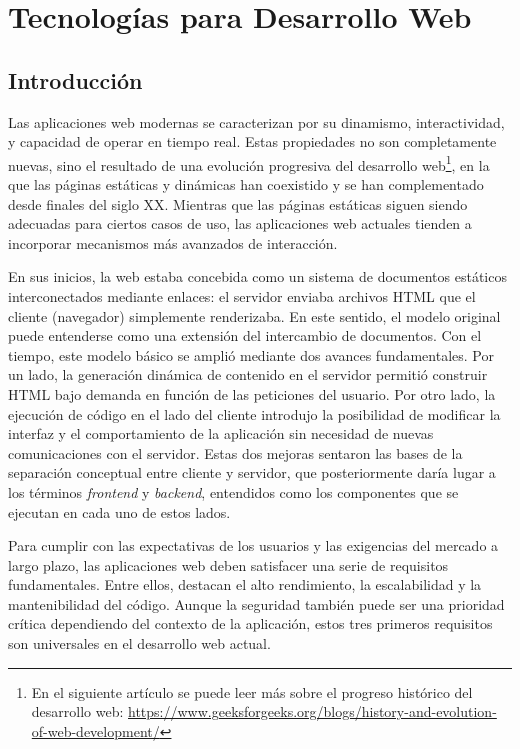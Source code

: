\chapter{Tecnologías para Desarrollo Web}
\label{cap:estadoDelArteDeTecnologias}


\section{Introducción}

Las aplicaciones web modernas se caracterizan por su dinamismo, interactividad, y capacidad de operar en tiempo real. Estas propiedades no son completamente nuevas, sino el resultado de una evolución progresiva del desarrollo web\footnote{En el siguiente artículo se puede leer más sobre el progreso histórico del desarrollo web: \url{https://www.geeksforgeeks.org/blogs/history-and-evolution-of-web-development/}}, en la que las páginas estáticas y dinámicas han coexistido y se han complementado desde finales del siglo XX. Mientras que las páginas estáticas siguen siendo adecuadas para ciertos casos de uso, las aplicaciones web actuales tienden a incorporar mecanismos más avanzados de interacción. 

En sus inicios, la web estaba concebida como un sistema de documentos estáticos interconectados mediante enlaces: el servidor enviaba archivos HTML que el cliente (navegador) simplemente renderizaba. En este sentido, el modelo original puede entenderse como una extensión del intercambio de documentos. Con el tiempo, este modelo básico se amplió mediante dos avances fundamentales. Por un lado, la generación dinámica de contenido en el servidor permitió construir HTML bajo demanda en función de las peticiones del usuario. Por otro lado, la ejecución de código en el lado del cliente introdujo la posibilidad de modificar la interfaz y el comportamiento de la aplicación sin necesidad de nuevas comunicaciones con el servidor. Estas dos mejoras sentaron las bases de la separación conceptual entre cliente y servidor, que posteriormente daría lugar a los términos \textit{frontend} y \textit{backend}, entendidos como los componentes que se ejecutan en cada uno de estos lados.

Para cumplir con las expectativas de los usuarios y las exigencias del mercado a largo plazo, las aplicaciones web deben satisfacer una serie de requisitos fundamentales. Entre ellos, destacan el alto rendimiento, la escalabilidad y la mantenibilidad del código. Aunque la seguridad también puede ser una prioridad crítica dependiendo del contexto de la aplicación, estos tres primeros requisitos son universales en el desarrollo web actual.

